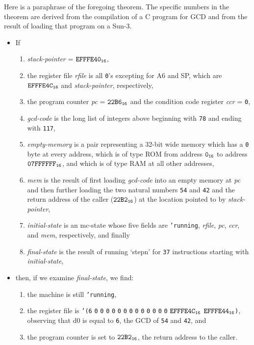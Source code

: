  \bigskip Here is a paraphrase of the foregoing theorem.  The
 specific numbers in the theorem are derived from the compilation of
 a C program for GCD and from the result of loading that program on
 a Sun-3.
 \begin{itemize}
 \item If \begin{enumerate}
 \item {\it{stack-pointer\/}} = ${\tt{EFFFE40}_{16}}$,
 \item the register file {\it{rfile\/}} is all {\tt{0}}'s excepting for A6 and SP,
 which are ${\tt{EFFFE4C}_{16}}$ and {\it{stack-pointer\/}}, respectively,
 \item   the program counter {\it{pc\/}} = ${\tt{22B6}_{16}}$ and the condition code register {\it{ccr\/}} = {\tt{0}},
 \item  {\it{gcd-code\/}} is the long list of integers above beginning with {\tt{78}}
 and ending with {\tt{117}},
 \item {\it{empty-memory\/}} is a pair representing a 32-bit wide memory
 which has a {\tt{0}} byte at every address, which is of type ROM from
 address ${\tt{0}_{16}}$ to address ${\tt{07FFFFFF}_{16}}$, and which is of type RAM at
 all other addresses,
 \item  {\it{mem\/}} is the result of first loading
 {\it{gcd-code\/}} into an empty memory at {\it{pc\/}} and then further loading the
 two natural numbers {\tt{54}} and {\tt{42}} and the return address of the
 caller (${\tt{22B2}_{16}}$) at the location pointed to by
 {\it{stack-pointer\/}},
 \item  {\it{initial-state\/}} is an mc-state whose five fields
 are {\tt{'}}{\tt{running}}, {\it{rfile\/}}, {\it{pc\/}}, {\it{ccr\/}}, and {\it{mem\/}}, respectively, and finally
 \item  {\it{final-state\/}} is the result of running `stepn' for
 {\tt{37}} instructions starting with {\it{initial-state\/}}, \end{enumerate}
 \item then, if we examine {\it{final-state\/}}, we
 find:
 \begin{enumerate}
 \item the machine is still {\tt{'}}{\tt{running}},
 \item the register file is {\tt{'}}{\tt{(}}{\tt{6}} {\tt{0}} {\tt{0}} {\tt{0}} {\tt{0}} {\tt{0}} {\tt{0}} {\tt{0}} {\tt{0}} {\tt{0}} {\tt{0}} {\tt{0}} {\tt{0}} {\tt{0}} ${\tt{EFFFE4C}_{16}}$ ${\tt{EFFFE44}_{16}}${\tt{)}}, observing that d0 is
 equal to {\tt{6}}, the GCD of {\tt{54}} and {\tt{42}}, and
 \item  the program counter is set to
 ${\tt{22B2}_{16}}$, the return address to the caller. \end{enumerate} \end{itemize}

